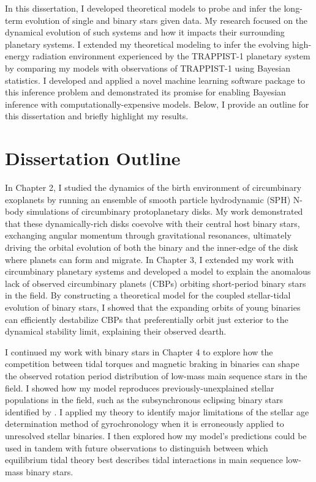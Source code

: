 In this dissertation, I developed theoretical models to probe and infer the long-term evolution of single and binary stars given data. My research focused on the dynamical evolution of such systems and how it impacts their surrounding planetary systems. I extended my theoretical modeling to infer the evolving high-energy radiation environment experienced by the TRAPPIST-1 planetary system by comparing my models with observations of TRAPPIST-1 using Bayesian statistics. I developed and applied a novel machine learning software package to this inference problem and demonstrated its promise for enabling Bayesian inference with computationally-expensive models. Below, I provide an outline for this dissertation and briefly highlight my results. 

\section{Dissertation Outline}

In Chapter 2, I studied the dynamics of the birth environment of circumbinary exoplanets by running an ensemble of smooth particle hydrodynamic (SPH) N-body simulations of circumbinary protoplanetary disks. My work demonstrated that these dynamically-rich disks coevolve with their central host binary stars, exchanging angular momentum through gravitational resonances, ultimately driving the orbital evolution of both the binary and the inner-edge of the disk where planets can form and migrate. In Chapter 3, I extended my work with circumbinary planetary systems and developed a model to explain the anomalous lack of observed circumbinary planets (CBPs) orbiting short-period binary stars in the \kepler field. By constructing a theoretical model for the coupled stellar-tidal evolution of binary stars, I showed that the expanding orbits of young binaries can efficiently destabilize CBPs that preferentially orbit just exterior to the dynamical stability limit, explaining their observed dearth.

I continued my work with binary stars in Chapter 4 to explore how the competition between tidal torques and magnetic braking in binaries can shape the observed rotation period distribution of low-mass main sequence stars in the \kepler field. I showed how my model reproduces previously-unexplained stellar populations in the \kepler field, such as the subsynchronous eclipsing binary stars identified by \citet{Lurie2017}. I applied my theory to identify major limitations of the stellar age determination method of gyrochronology when it is erroneously applied to unresolved stellar binaries. I then explored how my model's predictions could be used in tandem with future observations to distinguish between which equilibrium tidal theory best describes tidal interactions in main sequence low-mass binary stars.


